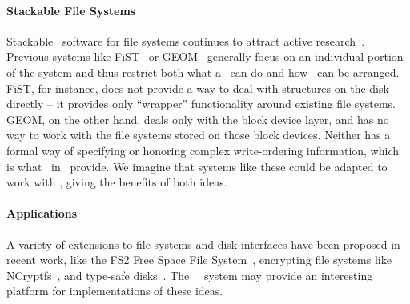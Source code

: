 \paragraph{Stackable File Systems}


Stackable \module\ software for file systems continues to attract active
research~\cite{rosenthal90evolving, heidemann91layered, skinner93stacking,
heidemann94filesystem,zadok99extending,
zadok00fist,wright03ncryptfs,wright06versatility}. Previous
systems like FiST~\cite{zadok00fist} or GEOM~\cite{geom} generally focus on
an individual portion of the system and thus restrict both what a \module\
can do and how \modules\ can be arranged. FiST, for instance, does not
provide a way to deal with structures on the disk directly -- it provides
only ``wrapper'' functionality around existing file
systems. %
GEOM, on the other hand, deals only with the block device layer, and has no
way to work with the file systems stored on those block devices. Neither
has a formal way of specifying or honoring complex write-ordering
information, which is what \patches\ in \Kudos\ provide. We imagine that
systems like these could be adapted to work with \patches, giving the
benefits of both ideas.

\paragraph{Applications}

A variety of extensions to file systems and disk interfaces have been proposed
in recent work, like the FS2 Free Space File System~\cite{huang05fs2},
encrypting file systems like NCryptfs~\cite{wright03ncryptfs}, and type-safe
disks~\cite{sivathanu06typesafe}. The \Kudos\
\module\ system may provide an interesting platform for implementations 
of these ideas.
